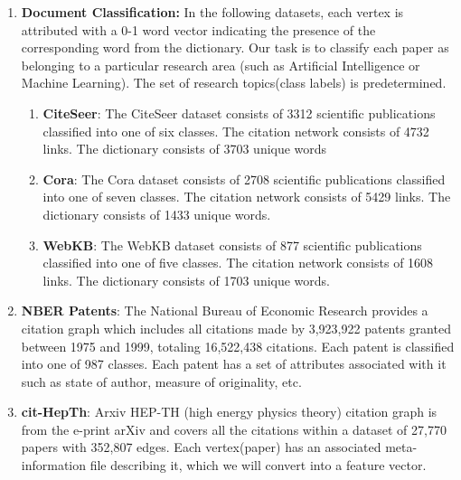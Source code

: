 \documentclass{article}
\begin{document}
\begin{enumerate}
\item \textbf{Document Classification:} In the following datasets, each vertex is attributed with a 0-1 word vector indicating the presence of the corresponding word from the dictionary. Our task is to classify each paper as belonging to a particular research area (such as Artificial Intelligence or Machine Learning). The set of research topics(class labels) is predetermined.
\begin{enumerate}
\item \textbf{CiteSeer}: The CiteSeer dataset consists of 3312 scientific publications classified into one of six classes. The citation network consists of 4732 links. The dictionary consists of 3703 unique words
\item \textbf {Cora}: The Cora dataset consists of 2708 scientific publications classified into one of seven classes. The citation network consists of 5429 links. The dictionary consists of 1433 unique words. 
\item \textbf{WebKB}: The WebKB dataset consists of 877 scientific publications classified into one of five classes. The citation network consists of 1608 links. The dictionary consists of 1703 unique words.
\end{enumerate}
\item \textbf{NBER Patents}: The National Bureau of Economic Research provides a citation graph which includes all citations made by 3,923,922 patents granted between 1975 and 1999, totaling 16,522,438 citations. Each patent is classified into one of 987 classes. Each patent has a set of attributes associated with it such as state of author, measure of originality, etc.
\item \textbf{cit-HepTh}: Arxiv HEP-TH (high energy physics theory) citation graph is from the e-print arXiv and covers all the citations within a dataset of 27,770 papers with 352,807 edges. Each vertex(paper) has an associated meta-information file describing it, which we will convert into a feature vector.
\end{enumerate}   
\end{document}
